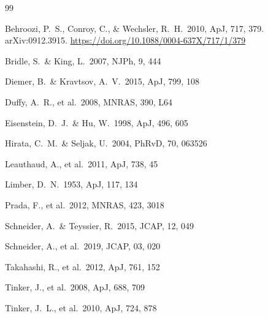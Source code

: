 \documentclass[12pt,a4paper]{article}
\begin{document}

\begin{thebibliography}{99}

Behroozi, P.\ S., Conroy, C., \& Wechsler, R.\ H.\ 2010, ApJ, 717, 379.
\newblock arXiv:0912.3915. \url{https://doi.org/10.1088/0004-637X/717/1/379}

Bridle, S.\ \& King, L.\ 2007, NJPh, 9, 444

Diemer, B.\ \& Kravtsov, A.\ V.\ 2015, ApJ, 799, 108

Duffy, A.\ R., et al.\ 2008, MNRAS, 390, L64

Eisenstein, D.\ J.\ \& Hu, W.\ 1998, ApJ, 496, 605

Hirata, C.\ M.\ \& Seljak, U.\ 2004, PhRvD, 70, 063526

Leauthaud, A., et al.\ 2011, ApJ, 738, 45

Limber, D.\ N.\ 1953, ApJ, 117, 134

Prada, F., et al.\ 2012, MNRAS, 423, 3018

Schneider, A.\ \& Teyssier, R.\ 2015, JCAP, 12, 049

Schneider, A., et al.\ 2019, JCAP, 03, 020

Takahashi, R., et al.\ 2012, ApJ, 761, 152

Tinker, J., et al.\ 2008, ApJ, 688, 709

Tinker, J.\ L., et al.\ 2010, ApJ, 724, 878

\end{thebibliography}
\end{document}
